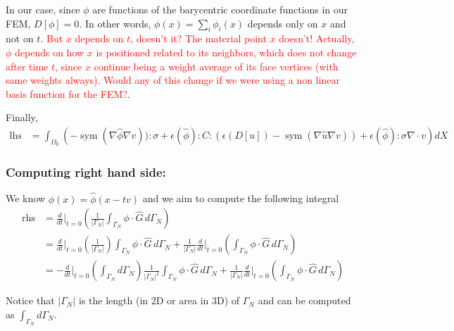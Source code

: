 \documentclass[11pt]{article}
\DeclareMathOperator{\sym}{sym}
\DeclareMathOperator{\lhs}{lhs}
\DeclareMathOperator{\rhs}{rhs}
\begin{document}
In our case, since $\phi$ are functions of the barycentric coordinate functions in our FEM, $D[\phi] = 0$. In other words, $\phi(x) = \sum_i \phi_i(x)$ depends only on $x$ and not on $t$. \textcolor{red}{But $x$ depends on $t$, doesn't it? The material point $x$ doesn't! Actually, $\phi$ depends on how $x$ is positioned related to its neighbors, which does not change after time $t$, since $x$ continue being a weight average of its face vertices (with same weights always). Would any of this change if we were using a non linear basis function for the FEM?}.

Finally,
\begin{align*}
  \lhs &= \int_{\Omega_0} \left(- \sym(\nabla \hat \phi \nabla v)):\sigma + \epsilon(\hat \phi):C:(\epsilon(D[ u])  - \sym(\nabla \hat u \nabla v)) + \epsilon(\hat \phi): \sigma \nabla \cdot v \right) dX
\end{align*}

\subsubsection{Computing right hand side:}
We know $\phi(x) = \hat \phi(x - tv)$ and we aim to compute the following integral
\begin{align*}
  \rhs &= \frac{d}{dt} \Big|_{t=0} \left( \frac{1}{|\Gamma_N|} \int_{\Gamma_N} \phi \cdot \hat G\, d\Gamma_N\right)\\ 
  &= \frac{d}{dt} \Big|_{t=0} \left( \frac{1}{|\Gamma_N|} \right) \int_{\Gamma_N} \phi \cdot \hat G\, d\Gamma_N  + \frac{1}{|\Gamma_N|} \frac{d}{dt} \Big|_{t=0} \left( \int_{\Gamma_N} \phi \cdot \hat G\, d\Gamma_N \right)\\
  &= -\frac{d}{dt} \Big|_{t=0} \left( \int_{\Gamma_N} d\Gamma_N \right) \frac{1}{|\Gamma_N|^2} \int_{\Gamma_N} \phi \cdot \hat G\, d\Gamma_N  + \frac{1}{|\Gamma_N|} \frac{d}{dt} \Big|_{t=0} \left( \int_{\Gamma_N} \phi \cdot \hat G\, d\Gamma_N \right)
\end{align*} 

Notice that $|\Gamma_N|$ is the length (in 2D or area in 3D) of $\Gamma_N$ and can be computed as $\int_{\Gamma_N} d\Gamma_N$.
\end{document}
